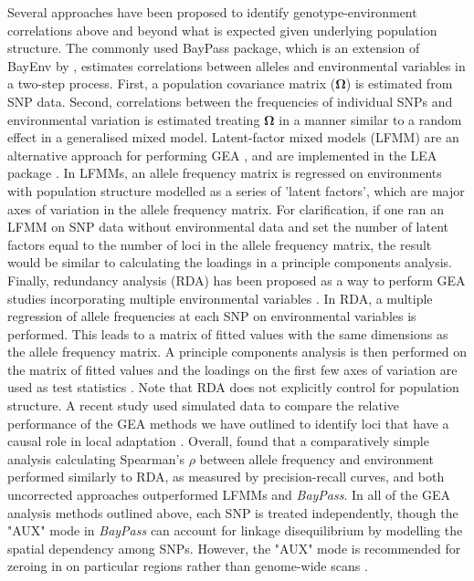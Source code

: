 \documentclass[10pt,twoside,lineno]{GSA_format}
\begin{document}
Several approaches have been proposed to identify genotype-environment correlations above and beyond what is expected given underlying population structure. The commonly used BayPass \citep{Gautier2015} package, which is an extension of BayEnv by \cite{Coop2010}, estimates correlations between alleles and environmental variables in a two-step process. First, a population covariance matrix (\textbf{$\mathbf{\Omega}$}) is estimated from SNP data. Second, correlations between the frequencies of individual SNPs and environmental variation is estimated treating \textbf{$\mathbf{\Omega}$} in a manner similar to a random effect in a generalised mixed model. Latent-factor mixed models (LFMM) are an alternative approach for performing GEA \citep{Frichot2013}, and are implemented in the LEA package \citep{Frichot2015}. In LFMMs, an allele frequency matrix is regressed on environments with population structure modelled as a series of 'latent factors', which are major axes of variation in the allele frequency matrix. For clarification, if one ran an LFMM on SNP data without environmental data and set the number of latent factors equal to the number of loci in the allele frequency matrix, the result would be similar to calculating the loadings in a principle components analysis. Finally, redundancy analysis (RDA) has been proposed as a way to perform GEA studies incorporating multiple environmental variables \citep{Forester2016, Forester2018}. In RDA, a multiple regression of allele frequencies at each SNP on environmental variables is performed. This leads to a matrix of fitted values with the same dimensions as the allele frequency matrix. A principle components analysis is then performed on the matrix of fitted values and the loadings on the first few axes of variation are used as test statistics \citep{Legendre2012}. Note that RDA does not explicitly control for population structure. A recent study used simulated data to compare the relative performance of the GEA methods we have outlined to identify loci that have a causal role in local adaptation \citep{Lotterhos2019-ki}. Overall, \cite{Lotterhos2019-ki} found that a comparatively simple analysis calculating Spearman's $\rho$ between allele frequency and environment performed similarly to RDA, as measured by precision-recall curves, and both uncorrected approaches outperformed LFMMs and \textit{BayPass}. In all of the GEA analysis methods outlined above, each SNP is treated independently, though the "AUX" mode in \textit{BayPass} can account for linkage disequilibrium by modelling the spatial dependency among SNPs. However, the "AUX" mode is recommended for zeroing in on particular regions rather than genome-wide scans \citep{Gautier2015}.\\
\end{document}
